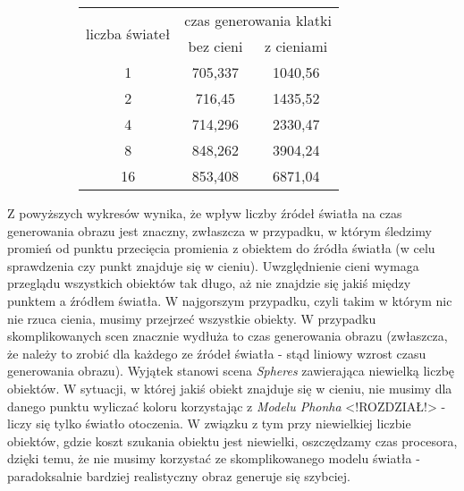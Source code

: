 \begin{figure}[!ht]
\advance\leftskip-2cm
\begin{subfigure}{.5\textwidth}
\end{subfigure}
\hspace{2cm}
\begin{subfigure}{.5\textwidth}
		\begin{longtable}{|c|c|c|} \hline
		\multirow{2}{*}{liczba świateł} & \multicolumn{2}{|c|}{czas generowania klatki} \\ \cline{2-3}
	    & bez cieni & z cieniami \\ \hline
	    1 & 705,337 & 1040,56 \\
	    2 & 716,45 & 1435,52 \\
		4 & 714,296 & 2330,47 \\
		8 & 848,262 & 3904,24 \\
		16 & 853,408 & 6871,04 \\
		\hline
		\end{longtable}
\end{subfigure}
\end{figure}

Z powyższych wykresów wynika, że wpływ liczby źródeł światła na czas generowania obrazu jest znaczny, zwłaszcza w przypadku, w którym śledzimy promień od punktu przecięcia promienia z obiektem do źródła światła (w celu sprawdzenia czy punkt znajduje się w cieniu). Uwzględnienie cieni wymaga przeglądu wszystkich obiektów tak długo, aż nie znajdzie się jakiś między punktem a źródłem światła. W najgorszym przypadku, czyli takim w którym nic nie rzuca cienia, musimy przejrzeć wszystkie obiekty. W przypadku skomplikowanych scen znacznie wydłuża to czas generowania obrazu (zwłaszcza, że należy to zrobić dla każdego ze źródeł światła - stąd liniowy wzrost czasu generowania obrazu). Wyjątek stanowi scena \emph{Spheres} zawierająca niewielką liczbę obiektów. W sytuacji, w której jakiś obiekt znajduje się w cieniu, nie musimy dla danego punktu wyliczać koloru korzystając z \emph{Modelu Phonha} <!ROZDZIAŁ!> - liczy się tylko światło otoczenia. W związku z tym przy niewielkiej liczbie obiektów, gdzie koszt szukania obiektu jest niewielki, oszczędzamy czas procesora, dzięki temu, że nie musimy korzystać ze skomplikowanego modelu światła - paradoksalnie bardziej realistyczny obraz generuje się szybciej.

